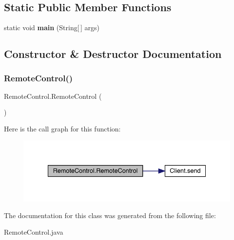 \subsection*{Static Public Member Functions}
\begin{DoxyCompactItemize}
\item 
\mbox{\label{class_remote_control_ac62565b65347727a059130f02a7a3e97}} 
static void {\bfseries main} (String\mbox{[}$\,$\mbox{]} args)
\end{DoxyCompactItemize}


\subsection{Constructor \& Destructor Documentation}
\mbox{\label{class_remote_control_a32595c785f3eac1903ddc620fc2d7671}} 
\subsubsection{\texorpdfstring{RemoteControl()}{RemoteControl()}}
{\footnotesize\ttfamily Remote\+Control.\+Remote\+Control (\begin{DoxyParamCaption}{ }\end{DoxyParamCaption})\hspace{0.3cm}{\ttfamily [inline]}}

Here is the call graph for this function\+:
\nopagebreak
\begin{figure}[H]
\begin{center}
\leavevmode
\includegraphics[width=335pt]{class_remote_control_a32595c785f3eac1903ddc620fc2d7671_cgraph}
\end{center}
\end{figure}


The documentation for this class was generated from the following file\+:\begin{DoxyCompactItemize}
\item 
Remote\+Control.\+java\end{DoxyCompactItemize}
